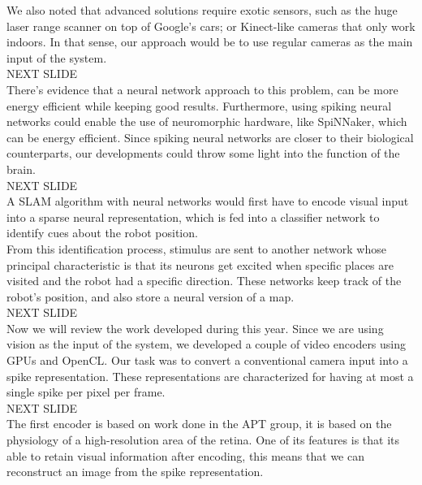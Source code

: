 \documentclass[12t,a4paper]{memoir}
\begin{document}
We also noted that advanced solutions require exotic sensors, such as the huge laser range scanner on top of Google's cars; or Kinect-like cameras that only work indoors. In that sense, our approach would be to use regular cameras as the main input of the system.\\

{\Large NEXT SLIDE}\\

There's evidence that a neural network approach to this problem, can be more energy efficient while keeping good results. Furthermore, using spiking neural networks could enable the use of neuromorphic hardware, like SpiNNaker, which can be energy efficient. Since spiking neural networks are closer to their biological counterparts, our developments could throw some light into the function of the brain.\\

{\Large NEXT SLIDE}\\

A SLAM algorithm with neural networks would first have to encode visual input into a sparse neural representation, which is fed into a classifier network to identify cues about the robot position.\\

From this identification process, stimulus are sent to another network whose principal characteristic is that its neurons get excited when specific places are visited and the robot had a specific direction. These networks keep track of the robot's position, and also store a neural version of a map. \\

{\Large NEXT SLIDE}\\

Now we will review the work developed during this year. Since we are using vision as the input of the system, we developed a couple of video encoders using GPUs and OpenCL. Our task was to convert a conventional camera input into a spike representation. These representations are characterized for having at most a single spike per pixel per frame.\\

{\Large NEXT SLIDE}\\

The first encoder is based on work done in the APT group, it is based on the physiology of a high-resolution area of the retina. One of its features is that its able to retain visual information after encoding, this means that we can reconstruct an image from the spike representation.\\
\end{document}
